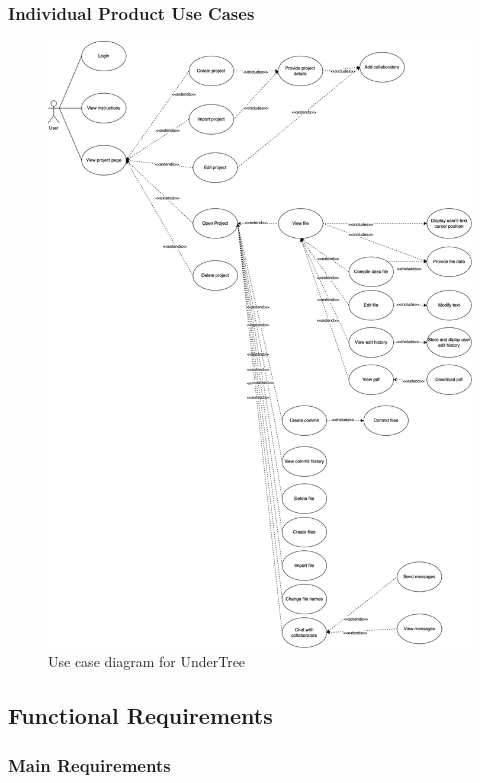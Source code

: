 \documentclass[12pt, titlepage]{article}
\begin{document}
	\subsubsection{Individual Product Use Cases}
	\begin{figure}[H]
		\centering
		\includegraphics[scale=0.09]{use_case_updated.png}
		\caption{Use case diagram for UnderTree
		}
	\end{figure}
	\restoregeometry
	
	\subsection{Functional Requirements}
	
	\subsubsection{Main Requirements}
	
\end{document}
